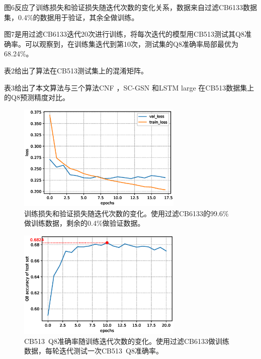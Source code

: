 \documentclass[a4paper, tikz]{article}
\begin{document}
图6反应了训练损失和验证损失随迭代次数的变化关系，数据来自过滤CB6133数据集，0.4\%的数据用于验证，其余全做训练。

图7是用过滤CB6133迭代20次进行训练，将每次迭代的模型用CB513测试其Q8准确率。可以观察到，在训练集迭代到第10次，测试集的Q8准确率局部最优为68.24\%。

表2给出了算法在CB513测试集上的混淆矩阵。

表3给出了本文算法与三个算法CNF\citep{wang2010protein} ，SC-GSN\citep{zhou2014deep} 和LSTM large\citep{sonderby2014protein} 在CB513数据集上的Q8预测精度对比。


\newpage
\begin{figure}[htbp]
	\centering
	\includegraphics[width=0.7\textwidth]{pic/loss}
\caption{训练损失和验证损失随迭代次数的变化。使用过滤CB6133的99.6\%\\做训练数据，剩余的0.4\%做验证数据。}
\label{fig:fig}
\end{figure}

\begin{figure}[htbp]
	\centering
	\includegraphics[width=0.7\textwidth]{pic/val_q8}
\caption{CB513\ Q8准确率随训练迭代次数的变化。使用过滤CB6133做训练\\数据，每轮迭代测试一次CB513\ Q8准确率。}
\label{fig:fig}
\end{figure}
\newpage
\end{document}
